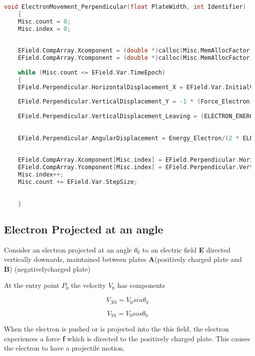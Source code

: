 \documentclass[a4paper,20pt,twoside]{report}
\begin{document}
	\begin{lstlisting}[language = C]
	void ElectronMovement_Perpendicular(float PlateWidth, int Identifier)
	{		
	Misc.count = 0;
	Misc.index = 0;
	
	
	EField.CompArray.Xcomponent = (double *)calloc(Misc.MemAllocFactor, sizeof(double));
	EField.CompArray.Ycomponent = (double *)calloc(Misc.MemAllocFactor, sizeof(double));
	
	while (Misc.count <= EField.Var.TimeEpoch)
	{
	EField.Perpendicular.HorizontalDisplacement_X = EField.Var.InitialVelocity * Misc.count;
	
	EField.Perpendicular.VerticalDisplacement_Y = -1 * (Force_Electron / 2 * ELECTRON_MASS) * pow(Misc.count,2);
	
	EField.Perpendicular.VerticalDisplacement_Leaving = (ELECTRON_ENERGY / 2 * ELECTRON_MASS) * Energy_Electron * (PlateWidth / pow(EField.Var.InitialVelocity, 2));
	
	
	EField.Perpendicular.AngularDisplacement = Energy_Electron/(2 * ELECTRON_MASS * EField.Var.InitialVelocity) * pow(EField.Perpendicular.HorizontalDisplacement_X,2);
	
	
	EField.CompArray.Xcomponent[Misc.index] = EField.Perpendicular.HorizontalDisplacement_X;
	EField.CompArray.Ycomponent[Misc.index] = EField.Perpendicular.VerticalDisplacement_Y;
	Misc.index++;
	Misc.count += EField.Var.StepSize;
	
	
	}
	\end{lstlisting}
	
	\subsection{Electron Projected at an angle}
	Consider an electron projected at an angle $\theta_0$ to an electric field \textbf{E} 
	directed vertically downards, maintained between plates 
	\textbf{A}(positively charged plate and \textbf{B}) (negativelycharged plate)
		
		At the entry point $P_0$ the velocity $V_0$ has components 
		
		\begin{equation}
		V_{X0} = V_0 sin\theta_0 %
		\end{equation}
		
		\begin{equation}
		V_{Y0} = V_0 cos\theta_0
		\end{equation}
	
	
	When the electron is pushed or is projected into the this field, the electron experiences 
	a force \textbf{f} which is directed to the positively charged plate. This causes the electron
	to have a projectile motion.\\
	
\end{document}
